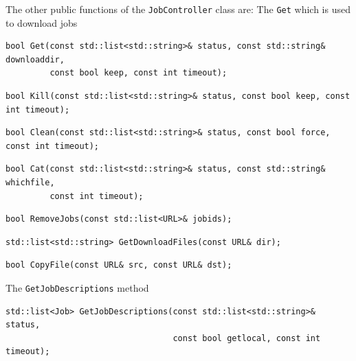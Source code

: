\documentclass{book}
\newcommand{\JobController}{\texttt{JobController}}
\begin{document}
The other public functions of the {\JobController} class are:
The \texttt{Get} which is used to download jobs
\begin{shaded}
\begin{verbatim}
bool Get(const std::list<std::string>& status, const std::string& downloaddir,
         const bool keep, const int timeout);
\end{verbatim}
\end{shaded}
\begin{shaded}
\begin{verbatim}
bool Kill(const std::list<std::string>& status, const bool keep, const int timeout);
\end{verbatim}
\end{shaded}
\begin{shaded}
\begin{verbatim}
bool Clean(const std::list<std::string>& status, const bool force, const int timeout);
\end{verbatim}
\end{shaded}
\begin{shaded}
\begin{verbatim}
bool Cat(const std::list<std::string>& status, const std::string& whichfile, 
         const int timeout);
\end{verbatim}
\end{shaded}
\begin{shaded}
\begin{verbatim}
bool RemoveJobs(const std::list<URL>& jobids);
\end{verbatim}
\end{shaded}
\begin{shaded}
\begin{verbatim}
std::list<std::string> GetDownloadFiles(const URL& dir);
\end{verbatim}
\end{shaded}
\begin{shaded}
\begin{verbatim}
bool CopyFile(const URL& src, const URL& dst);
\end{verbatim}
\end{shaded}
The \texttt{GetJobDescriptions} method 
\begin{shaded}
\begin{verbatim}
std::list<Job> GetJobDescriptions(const std::list<std::string>& status, 
                                  const bool getlocal, const int timeout);
\end{verbatim}
\end{shaded}
\end{document}
